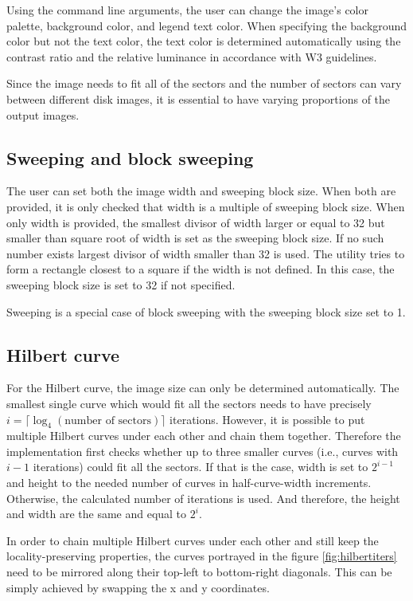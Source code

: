 \documentclass[
  digital, %
  oneside, %
  lof,     %
  lot,     %
]{fithesis4}
\begin{document}
Using the command line arguments, the user can change the image's color palette, background color, and legend text color.
When specifying the background color but not the text color, the text color is determined automatically using the contrast ratio and the relative luminance in accordance with W3 guidelines.\cite{w3guidelines}

Since the image needs to fit all of the sectors and the number of sectors can vary between different disk images, it is essential to have varying proportions of the output images.

\subsection{Sweeping and block sweeping}

The user can set both the image width and sweeping block size.
When both are provided, it is only checked that width is a multiple of sweeping block size.
When only width is provided, the smallest divisor of width larger or equal to 32 but smaller than square root of width is set as the sweeping block size.
If no such number exists largest divisor of width smaller than 32 is used.
The utility tries to form a rectangle closest to a square if the width is not defined.
In this case, the sweeping block size is set to 32 if not specified.

Sweeping is a special case of block sweeping with the sweeping block size set to 1.

\subsection{Hilbert curve}

For the Hilbert curve, the image size can only be determined automatically.
The smallest single curve which would fit all the sectors needs to have precisely $i = \lceil\log_4(\text{number of sectors})\rceil$ iterations.
However, it is possible to put multiple Hilbert curves under each other and chain them together.
Therefore the implementation first checks whether up to three smaller curves (i.e., curves with $i - 1$ iterations) could fit all the sectors.
If that is the case, width is set to $2^{i - 1}$ and height to the needed number of curves in half-curve-width increments.
Otherwise, the calculated number of iterations is used.
And therefore, the height and width are the same and equal to $2^i$.

In order to chain multiple Hilbert curves under each other and still keep the locality-preserving properties, the curves portrayed in the figure \ref{fig:hilbertiters} need to be mirrored along their top-left to bottom-right diagonals.
This can be simply achieved by swapping the x and y coordinates.
\end{document}
